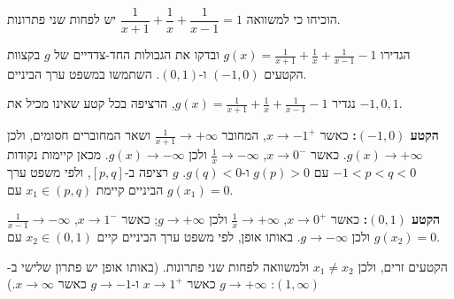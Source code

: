 
\begin{question}
הוכיחו כי למשוואה $\dfrac{1}{x+1}+\dfrac1x+\dfrac{1}{x-1}=1$ יש לפחות שני פתרונות.
\end{question}

\begin{hint}
הגדירו $g(x)=\frac{1}{x+1}+\frac1x+\frac1{x-1}-1$ ובדקו את הגבולות החד-צדדיים של $g$ בקצוות הקטעים $(-1,0)$ ו-$(0,1)$. השתמשו במשפט ערך הביניים.
\end{hint}

\begin{solution}
נגדיר $g(x)=\frac{1}{x+1}+\frac1x+\frac1{x-1}-1$, הרציפה בכל קטע שאינו מכיל את $-1,0,1$.

\textbf{הקטע $(-1,0)$:} כאשר $x\to-1^+$, המחובר $\frac1{x+1}\to+\infty$ ושאר המחוברים חסומים, ולכן $g(x)\to+\infty$. כאשר $x\to0^-$, $\frac1x\to-\infty$ ולכן $g(x)\to-\infty$. מכאן קיימות נקודות $-1<p<q<0$ עם $g(p)>0$ ו-$g(q)<0$. $g$ רציפה ב-$[p,q]$, ולפי משפט ערך הביניים קיימת $x_1\in(p,q)$ עם $g(x_1)=0$.

\textbf{הקטע $(0,1)$:} כאשר $x\to0^+$, $\frac1x\to+\infty$ ולכן $g\to+\infty$; כאשר $x\to1^-$, $\frac1{x-1}\to-\infty$ ולכן $g\to-\infty$. באותו אופן, לפי משפט ערך הביניים קיים $x_2\in(0,1)$ עם $g(x_2)=0$.

הקטעים זרים, ולכן $x_1\ne x_2$ ולמשוואה לפחות שני פתרונות. (באותו אופן יש פתרון שלישי ב-$(1,\infty)$: $g\to+\infty$ כאשר $x\to1^+$ ו-$g\to-1$ כאשר $x\to\infty$.)
\end{solution}
